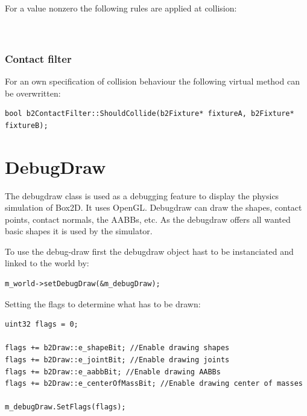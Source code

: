 \documentclass[10pt,a4paper,DIV=11]{scrreprt}
\begin{document}
For a value nonzero the following rules are applied at collision: \\

   \\
\\

\subsubsection*{Contact filter}
For an own specification of collision behaviour the following virtual method can be overwritten: \\
\begin{lstlisting}[caption={The contact filter method},label=lst:box2d-contactfiler]
bool b2ContactFilter::ShouldCollide(b2Fixture* fixtureA, b2Fixture* fixtureB);
\end{lstlisting}


\section{DebugDraw}
The debugdraw class is used as a debugging feature to display the physics simulation of Box2D. It uses OpenGL. Debugdraw can draw the shapes, contact points, contact normals, the AABBs, etc.
As the debugdraw offers all wanted basic shapes it is used by the simulator.

To use the debug-draw first the debugdraw object hast to be instanciated and linked to the world by: \\

\begin{lstlisting}[caption={Linking debugdraw instance to the world instance},label=lst:box2d-ddrawset]
m_world->setDebugDraw(&m_debugDraw);
\end{lstlisting}

Setting the flags to determine what has to be drawn:

\begin{lstlisting}[caption={Initializing DebugDraw},label=lst:box2d-ddrawinit]
uint32 flags = 0;

flags += b2Draw::e_shapeBit; //Enable drawing shapes
flags += b2Draw::e_jointBit; //Enable drawing joints
flags += b2Draw::e_aabbBit; //Enable drawing AABBs
flags += b2Draw::e_centerOfMassBit; //Enable drawing center of masses

m_debugDraw.SetFlags(flags);
\end{lstlisting}
\end{document}
